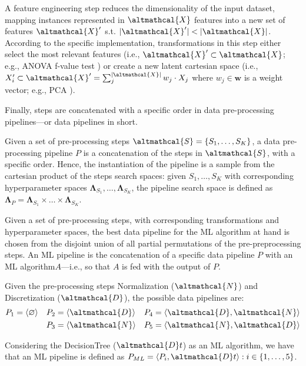 \begin{example}
    A feature engineering step reduces the dimensionality of the input dataset, mapping instances represented in $\altmathcal{X}$ features into a new set of features  $\altmathcal{X}'$ s.t.  $|\altmathcal{X}'| < |\altmathcal{X}|$.
    According to the specific implementation, transformations in this step either select the most relevant features (i.e., $\altmathcal{X}' \subset \altmathcal{X}$; e.g., ANOVA f-value test \cite{}) or create a new latent cartesian space (i.e., $X'_{i} \subset \altmathcal{X}' = \sum_{j}^{|\altmathcal{X}|} w_j \cdot X_j$ where $w_j \in \pmb{w}$ is a weight vector; e.g., PCA \cite{}).
\end{example}

Finally, steps are concatenated with a specific order in data pre-processing pipelines---or data pipelines in short.

\begin{definition}
    Given a set of pre-processing steps $\altmathcal{S} = \{S_1,\dots, S_{K}\}$, a data pre-processing pipeline $P$ is a concatenation of the steps in $\altmathcal{S}$, with a specific order.
    Hence, the instantiation of the pipeline is a sample from the cartesian product of the steps search spaces: given $S_1, \dots, S_K$ with corresponding hyperparameter spaces $\pmb{\Lambda}_{S_1}, \dots, \pmb{\Lambda}_{S_K}$, the pipeline search space is defined as  $\pmb{\Lambda}_P  = \pmb{\Lambda}_{S_1} \times \dots \times \pmb{\Lambda}_{S_K}$.
\end{definition}

Given a set of pre-processing steps, with corresponding transformations and hyperparameter spaces, the best data pipeline for the ML algorithm at hand is chosen from the disjoint union of all partial permutations of the pre-preprocessing steps.
An ML pipeline is the concatenation of a specific data pipeline $P$ with an ML algorithm$A$---i.e., so that $A$ is fed with the output of $P$.

\begin{example}
    \label{background-ex:ml-pipeline}
    Given the pre-processing steps Normalization ($\altmathcal{N}$) and Discretization ($\altmathcal{D}$), the possible data pipelines are:
    \begin{align*}
        P_1 &= \langle \varnothing \rangle &
        P_2 &= \langle \altmathcal{D} \rangle &
        P_4 &= \langle \altmathcal{D}, \altmathcal{N} \rangle \\
        &&
        P_3 &= \langle \altmathcal{N}\rangle & P_5 &= \langle \altmathcal{N}, \altmathcal{D} \rangle
    \end{align*}

    Considering the DecisionTree ($\altmathcal{D}t$) as an ML algorithm, we have that an ML pipeline is defined as $P_{ML} = \langle P_i, \altmathcal{D}t \rangle : i \in \{ 1, \dots, 5\}$.
\end{example}

